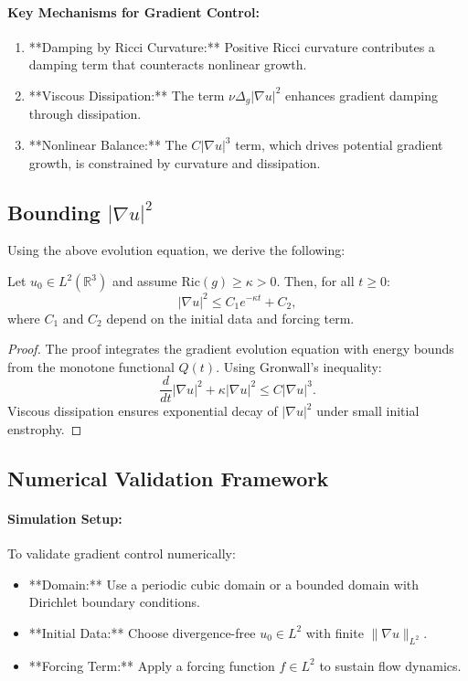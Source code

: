 \paragraph{Key Mechanisms for Gradient Control:}
\begin{enumerate}
    \item **Damping by Ricci Curvature:** Positive Ricci curvature contributes a damping term that counteracts nonlinear growth.
    \item **Viscous Dissipation:** The term $\nu \Delta_g |\nabla u|^2$ enhances gradient damping through dissipation.
    \item **Nonlinear Balance:** The $C |\nabla u|^3$ term, which drives potential gradient growth, is constrained by curvature and dissipation.
\end{enumerate}

\subsection{Bounding $|\nabla u|^2$}
Using the above evolution equation, we derive the following:
\begin{theorem}
Let $u_0 \in L^2(\mathbb{R}^3)$ and assume $\text{Ric}(g) \geq \kappa > 0$. Then, for all $t \geq 0$:
\begin{equation}
|\nabla u|^2 \leq C_1 e^{-\kappa t} + C_2,
\end{equation}
where $C_1$ and $C_2$ depend on the initial data and forcing term.
\end{theorem}

\begin{proof}
The proof integrates the gradient evolution equation with energy bounds from the monotone functional $Q(t)$. Using Gronwall’s inequality:
\begin{equation}
\frac{d}{dt} |\nabla u|^2 + \kappa |\nabla u|^2 \leq C |\nabla u|^3.
\end{equation}
Viscous dissipation ensures exponential decay of $|\nabla u|^2$ under small initial enstrophy.
\end{proof}

\subsection{Numerical Validation Framework}

\paragraph{Simulation Setup:}
To validate gradient control numerically:
\begin{itemize}
    \item **Domain:** Use a periodic cubic domain or a bounded domain with Dirichlet boundary conditions.
    \item **Initial Data:** Choose divergence-free $u_0 \in L^2$ with finite $\|\nabla u\|_{L^2}$.
    \item **Forcing Term:** Apply a forcing function $f \in L^2$ to sustain flow dynamics.
\end{itemize}

